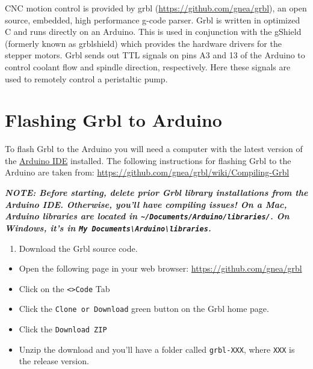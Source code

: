 \documentclass[
]{book}
\providecommand{\tightlist}{%
  \setlength{\itemsep}{0pt}\setlength{\parskip}{0pt}}
\begin{document}
CNC motion control is provided by grbl (\url{https://github.com/gnea/grbl}), an open source, embedded, high performance g-code parser. Grbl is written in optimized C and runs directly on an Arduino. This is used in conjunction with the gShield (formerly known as grblshield) which provides the hardware drivers for the stepper motors. Grbl sends out TTL signals on pins A3 and 13 of the Arduino to control coolant flow and spindle direction, respectively. Here these signals are used to remotely control a peristaltic pump.

\hypertarget{flashing-grbl-to-arduino}{%
\section{Flashing Grbl to Arduino}\label{flashing-grbl-to-arduino}}

To flash Grbl to the Arduino you will need a computer with the latest version of the \href{https://www.arduino.cc/en/Main/Software}{Arduino IDE} installed. The following instructions for flashing Grbl to the Arduino are taken from: \url{https://github.com/gnea/grbl/wiki/Compiling-Grbl}

\emph{\textbf{NOTE: Before starting, delete prior Grbl library installations from the Arduino IDE. Otherwise, you'll have compiling issues! On a Mac, Arduino libraries are located in \texttt{\textasciitilde{}/Documents/Arduino/libraries/}. On Windows, it's in \texttt{My\ Documents\textbackslash{}Arduino\textbackslash{}libraries}.}}

\begin{enumerate}
\def\labelenumi{\arabic{enumi}.}
\tightlist
\item
  Download the Grbl source code.
\end{enumerate}

\begin{itemize}
\tightlist
\item
  Open the following page in your web browser: \url{https://github.com/gnea/grbl}
\item
  Click on the \texttt{\textless{}\textgreater{}Code} Tab
\item
  Click the \texttt{Clone\ or\ Download} green button on the Grbl home page.
\item
  Click the \texttt{Download\ ZIP}
\item
  Unzip the download and you'll have a folder called \texttt{grbl-XXX}, where \texttt{XXX} is the release version.
\end{itemize}
\end{document}
